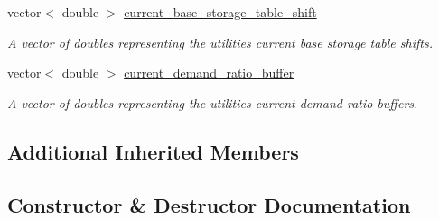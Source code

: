 \begin{DoxyCompactItemize}
vector$<$ double $>$ \mbox{\hyperlink{classContinuityModelROF_acaebccba4f4ed286c5da02d6c2c90605}{current\+\_\+base\+\_\+storage\+\_\+table\+\_\+shift}}
\begin{DoxyCompactList}\small\item\em A vector of doubles representing the utilities\textquotesingle{} current base storage table shifts. \end{DoxyCompactList}\item 
vector$<$ double $>$ \mbox{\hyperlink{classContinuityModelROF_a1a274033b741e664268515de8e8eb3bc}{current\+\_\+demand\+\_\+ratio\+\_\+buffer}}
\begin{DoxyCompactList}\small\item\em A vector of doubles representing the utilities\textquotesingle{} current demand ratio buffers. \end{DoxyCompactList}\end{DoxyCompactItemize}
\subsection*{Additional Inherited Members}


\subsection{Constructor \& Destructor Documentation}
\mbox{\label{classContinuityModelROF_a23bd422349e4e2246bd44b2007564fd1}} 
